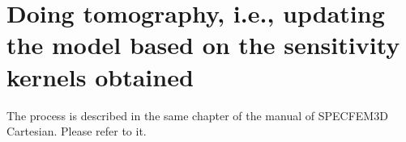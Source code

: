 \chapter{Doing tomography, i.e., updating the model based on the sensitivity kernels obtained}


The process is described in the same chapter of the manual of SPECFEM3D Cartesian. Please refer to it.



